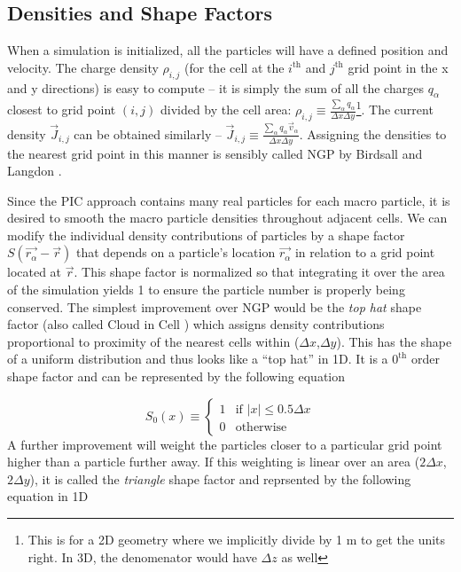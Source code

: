 \subsection{Densities and Shape Factors}

When a simulation is initialized, all the particles will have a defined position and velocity. The charge density $\rho_{i,j}$ (for the cell at the $i^\text{th}$ and $j^\text{th}$ grid point in the x and y directions) is easy to compute -- it is simply the sum of all the charges $q_\alpha$ closest to grid point $(i,j)$ divided by the cell area: $\rho_{i,j} \equiv \frac{\sum_\alpha q_\alpha}{\Delta x \Delta y}$\footnote{This is for a 2D geometry where we implicitly divide by 1 m to get the units right. In 3D, the denomenator would have $\Delta z$ as well}. The current density $\vec{J}_{i,j}$ can be obtained similarly -- $\vec{J}_{i,j} \equiv \frac{\sum_\alpha q_\alpha \vec{v}_\alpha}{\Delta x \Delta y}$. Assigning the densities to the nearest grid point in this manner is sensibly called \gls{NGP} by Birdsall and Langdon \cite{Birdsall_2004_PIC}.

Since the PIC approach contains many real particles for each macro particle, it is desired to smooth the macro particle densities throughout adjacent cells. We can modify the individual density contributions of particles by a shape factor $S(\vec{r_\alpha} - \vec{r})$ that depends on a particle's location $\vec{r_\alpha}$ in relation to a grid point located at $\vec{r}$. This shape factor is normalized so that integrating it over the area of the simulation yields 1 to ensure the particle number is properly being conserved. The simplest improvement over \gls{NGP} would be the \emph{top hat} shape factor (also called Cloud in Cell \cite{Birdsall_2004_PIC}) which assigns density contributions proportional to proximity of the nearest cells within ($\Delta x$,$\Delta y$). This has the shape of a uniform distribution and thus looks like a ``top hat'' in 1D. It is a $0^\text{th}$ order shape factor and can be represented by the following equation

\begin{equation}
	S_0(x) \equiv \begin{cases}
		1 & \text{if } \lvert x \rvert \leq 0.5 \Delta x \\
		0 & \text{otherwise}
	\end{cases} \label{eq:tophat}
\end{equation}
A further improvement will weight the particles closer to a particular grid point higher than a particle further away. If this weighting is linear over an area ($2 \Delta x$, $2 \Delta y$), it is called the \emph{triangle} shape factor and reprsented by the following equation in 1D

